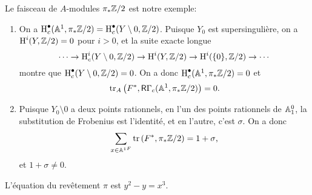 Le faisceau de $A$-modules $\pi_*\mathbb{Z}/2$ est notre exemple:
\begin{enumerate}[\indent a)]
  \item On a 
    $\operatorname{H}_c^\bullet(\mathbb{A}^1,\pi_*\mathbb{Z}/2) = \operatorname{H}_c^\bullet(Y\setminus 0,\mathbb{Z}/2)$. 
    Puisque $Y_0$ est supersingulière, on a $\operatorname{H}^i(Y,\mathbb{Z}/2)=0$ pour $i>0$, et 
    la suite exacte longue 
    \[
      \cdots \to \operatorname{H}_c^i(Y\setminus 0,\mathbb{Z}/2) \to \operatorname{H}^i(Y,\mathbb{Z}/2) \to \operatorname{H}^i(\{0\},\mathbb{Z}/2) \to \cdots
    \]
    montre que $\operatorname{H}_c^\bullet(Y\setminus 0,\mathbb{Z}/2)=0$. On a donc 
    $\operatorname{H}_c^\bullet(\mathbb{A}^1,\pi_*\mathbb{Z}/2)=0$ et 
    \[
      \operatorname{tr}_A\left(F^*,\mathsf{R}\Gamma_c(\mathbb{A}^1,\pi_*\mathbb{Z}/2)\right) = 0 \text{.}
    \]
  \item Puisque $Y_0\setminus 0$ a deux points rationnels, en l'un des points 
    rationnels de $\mathbb{A}_1^0$, la substitution de Frobenius est l'identité, et 
    en l'autre, c'est $\sigma$. On a donc 
    \[
      \sum_{x\in {\mathbb{A}^1}^F} \operatorname{tr}\left(F^*,\pi_*\mathbb{Z}/2\right) = 1+\sigma \text{,}
    \]
    et $1+\sigma\ne 0$.
\end{enumerate}

L'équation du revêtement $\pi$ est $y^2-y=x^3$.